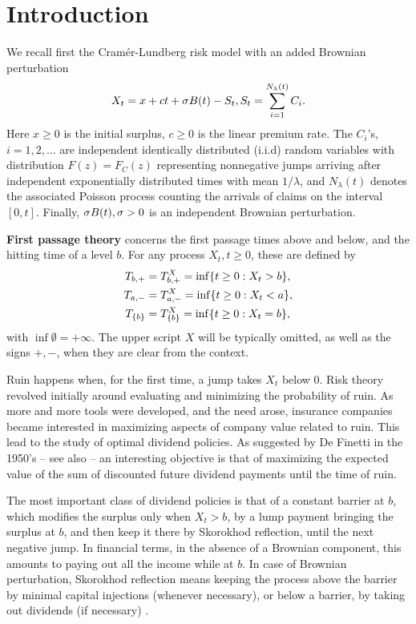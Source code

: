 
\section{Introduction}

We recall first  the Cram\'{e}r-Lundberg risk
model  with an added Brownian perturbation \cite{dufresne1991risk,AA}
\begin{align} \la{CLp}
X_t = x + c t + \s B(t) -S_t, S_t=\sum_{i=1}^{N_\lambda (t)} C_i.
\end{align}
Here $x \geq 0$ is the initial surplus, $c \geq 0$ is the linear premium rate. The
 $C_i$'s, $i=1,2,...$ are independent identically distributed (i.i.d)
random variables with distribution ${F(z)=F_C(z)}$ representing
nonnegative jumps arriving after independent exponentially distributed
times with mean $1/\lambda$, and $N_\lambda (t)$ denotes the associated Poisson
process counting the arrivals of claims on the interval $[0,t]$. Finally, $\sigma B(t),  \sigma >0$
is an independent Brownian perturbation.
 
 {\bf First passage theory}  concerns the first passage times above and below, and the hitting  time of a level $b$. For any process $X_t, t \geq 0$, these are defined by
\begin{equation}\la{fpt}
\begin{aligned}
\tb &= \tb^{X}=\inf\{t\geq 0: X_t> b\},\\
\ta&=\ta^X=\inf\{t\geq 0: X_t< a\},\\
T_{\{b\}}&=T_{\{b\}}^X =\inf\{t\geq 0: X_t=b\},
\end{aligned}
\end{equation}
with $\inf\emptyset=+\infty$. The upper script $X$ will be typically  omitted, as well as the signs $+,-$, when they are clear from the context.


Ruin happens when, for the first time, a jump takes $X_t$ below 0. Risk theory revolved initially around evaluating and minimizing the probability of ruin. As more and more tools were developed, and the need arose, insurance companies became interested in maximizing aspects of company value related to ruin. This lead to the study of optimal dividend policies.  As suggested by De Finetti in the 1950's \cite{deF} -- see also \cite{miller1961dividend} -- an interesting objective is that of maximizing the expected value of the sum of discounted future dividend payments until the time of ruin.


The most important class of dividend policies is that of a constant barrier
at $b$, which modifies the surplus only when $X_t>b$, by a lump payment
bringing the surplus at $b$, and then keep it there by Skorokhod
reflection, until the next negative jump.  In financial terms, in the
absence of a Brownian component, this amounts to paying out all the income
while at $b$.  In case of Brownian perturbation, Skorokhod reflection means
keeping the process above the barrier by minimal capital injections
(whenever necessary), or below a barrier, by taking out dividends (if
necessary) \cite{sk62}.

